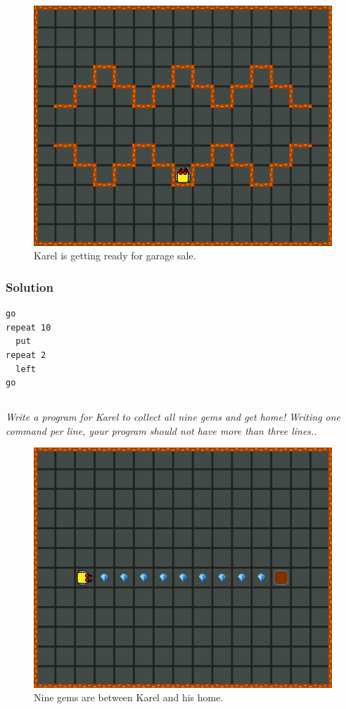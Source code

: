 \documentclass[article,A4,12pt]{llncs}
\begin{document}
{{{{\begin{figure}[!ht]
\begin{center}
\includegraphics[height=0.4\textwidth]{imgk/c04.png}
\end{center}
\vspace{-4mm}
\caption{Karel is getting ready for garage sale.}
\label{fig:c04}
\vspace{-10mm}
\end{figure}
\noindent

\subsubsection{Solution}
\begin{verbatim}
go
repeat 10
  put
repeat 2
  left
go
\end{verbatim}


\newpage
\subsection{}

{\em Write a program for Karel to collect all nine gems and get home! 
Writing one command per line, your program should not have more 
than three lines.}.

\begin{figure}[!ht]
\begin{center}
\includegraphics[height=0.4\textwidth]{imgk/c05.png}
\end{center}
\vspace{-4mm}
\caption{Nine gems are between Karel and his home.}
\label{fig:c05}
\end{figure}
\noindent

}}}}
\end{document}
